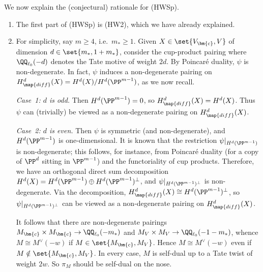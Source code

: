 \documentclass[12pt]{report}
\begin{document}
We now explain the (conjectural) rationale for (HWSp).
\begin{enumerate}[(1)]
    \item The first part of (HWSp) is (HW2),
    which we have already explained.
    
    \item For simplicity, say $m\geq 4$, i.e.~$m_\ast\geq 1$.
    Given $X\in\set{V_{\bm{c}},V}$ of dimension $d\in\set{m_\ast,1+m_\ast}$,
    consider the cup-product pairing
    where $\QQ_{\ell_0}(-d)$ denotes the Tate motive of weight $2d$.
    By Poincar\'{e} duality, $\psi$ is non-degenerate.
    In fact, $\psi$ induces a non-degenerate pairing on $H^d_{\map{diff}}(X)=H^d(X)/H^d(\PP^{m-1})$, as we now recall.
    
    \emph{Case~1: $d$ is odd.}
    Then $H^d(\PP^{m-1})=0$, so $H^d_{\map{diff}}(X)=H^d(X)$.
    Thus $\psi$ can (trivially) be viewed as a non-degenerate pairing on $H^d_{\map{diff}}(X)$.
    
    \emph{Case~2: $d$ is even.}
    Then $\psi$ is symmetric (and non-degenerate), and $H^d(\PP^{m-1})$ is one-dimensional.
    It is known that the restriction $\psi\vert_{H^d(\PP^{m-1})}$ is non-degenerate; this follows, for instance, from Poincar\'{e} duality (for a copy of $\PP^d$ sitting in $\PP^{m-1}$) and the functoriality of cup products.
    Therefore, we have an orthogonal direct sum decomposition $H^d(X) = H^d(\PP^{m-1})\oplus H^d(\PP^{m-1})^\perp$, and $\psi\vert_{H^d(\PP^{m-1})^\perp}$ is non-degenerate.
    Via the decomposition, $H^d_{\map{diff}}(X)\cong H^d(\PP^{m-1})^\perp$, so $\psi\vert_{H^d(\PP^{m-1})^\perp}$ can be viewed as a non-degenerate pairing on $H^d_{\map{diff}}(X)$.
    
    It follows that there are non-degenerate pairings
    $M_{\bm{c}}\times M_{\bm{c}}
    \to \QQ_{\ell_0}(-m_\ast)$
    and $M_V\times M_V
    \to \QQ_{\ell_0}(-1-m_\ast)$,
    whence $M\cong M^\vee(-w)$ if $M\in\set{M_{\bm{c}},M_V}$.
    Hence $M\cong M^\vee(-w)$ even if $M\notin\set{M_{\bm{c}},M_V}$.
    In every case,
    $M$ is self-dual up to a Tate twist of weight $2w$.
    So $\pi_M$ should be self-dual on the nose.
    

\end{enumerate}
\end{document}
